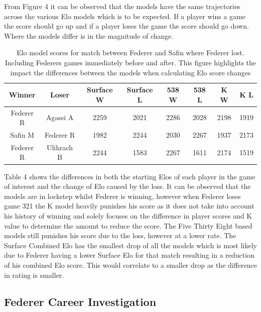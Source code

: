 \documentclass[12pt,a4paper]{article}
\begin{document}
From Figure 4 it can be observed that the models have the same trajectories across the
various Elo models which is to be expected. If a player wins a game the score should go
up and if a player loses the game the score should go down. Where the models differ is
in the magnitude of change.
\\
\begin{table}[H]
  \begin{tabular}{||c c c c c c c c||}
    \hline
    Winner    & Loser      & Surface W & Surface L & 538 W & 538 L & K W  & K L  \\
    \hline\hline
    Federer R & Agassi A   & 2259      & 2021      & 2286  & 2028  & 2198 & 1919 \\
    Safin M   & Federer R  & 1982      & 2244      & 2030  & 2267  & 1937 & 2173 \\
    Federer R & Ulihrach B & 2244      & 1583      & 2267  & 1611  & 2174 & 1519 \\

    \hline
  \end{tabular}
  \caption{Elo model scores for match between Federer and Safin where Federer lost.
    Including Federers games immediately before and after.
    This figure highlights the impact the differences between the models when calculating
    Elo score changes}
\end{table}
Table 4 shows the differences in both the starting Elos of each player in the game of
interest and the change of Elo caused by the loss.
It can be observed that the models are in lockstep whilst
Federer is winning, however when Federer loses game 321 the K model heavily punishes
his score as it does not take into account his history of winning and solely focuses on
the difference in player scores and K value to determine the amount to reduce the score.
The Five Thirty Eight based models still punishes his score due to the loss, however at a
lower rate. The Surface Combined Elo has the smallest drop of all the models which is most
likely due to Federer having a lower Surface Elo for that match resulting in a reduction
of his combined Elo score. This would correlate to a smaller drop as the difference in
rating is smaller.

\subsection{Federer Career Investigation}
\end{document}
